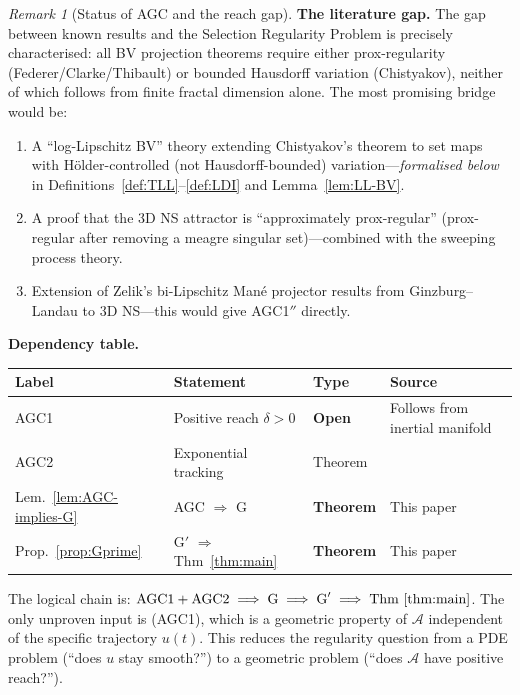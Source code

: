 \documentclass[12pt,a4paper]{article}
\theoremstyle{definition}
\theoremstyle{plain}
\theoremstyle{remark}
\newtheorem{remark}[definition]{Remark}
\begin{document}
\begin{remark}[Status of AGC and the reach gap]
\noindent
\textbf{The literature gap.}\;
The gap between known results and the Selection Regularity Problem is
precisely characterised: all BV projection theorems require either
prox-regularity (Federer/Clarke/Thibault) or bounded Hausdorff
variation (Chistyakov), neither of which follows from finite fractal
dimension alone.
The most promising bridge would be:
\begin{enumerate}
  \item A ``log-Lipschitz BV'' theory extending Chistyakov's theorem
    to set maps with H\"older-controlled (not Hausdorff-bounded)
    variation---\emph{formalised below} in
    Definitions~\ref{def:TLL}--\ref{def:LDI} and
    Lemma~\ref{lem:LL-BV}.
  \item A proof that the 3D NS attractor is ``approximately
    prox-regular'' (prox-regular after removing a meagre singular
    set)---combined with the sweeping process theory.
  \item Extension of Zelik's bi-Lipschitz Man\'e projector results
    from Ginzburg--Landau to 3D NS---this would give AGC1$''$
    directly.
\end{enumerate}

\medskip\noindent
\textbf{Dependency table.}
\medskip

\begin{center}
\begin{tabular}{llll}
\hline
\textbf{Label} & \textbf{Statement} & \textbf{Type} & \textbf{Source} \\
\hline
AGC1 & Positive reach $\delta > 0$ & \textbf{Open} &
  Follows from inertial manifold \\
AGC2 & Exponential tracking & Theorem &
  \cite{Temam2001} \\
Lem.~\ref{lem:AGC-implies-G} & AGC $\Rightarrow$ G &
  \textbf{Theorem} & This paper \\
Prop.~\ref{prop:Gprime} & G$'$ $\Rightarrow$
  Thm~\ref{thm:main} & \textbf{Theorem} & This paper \\
\hline
\end{tabular}
\end{center}

\medskip\noindent
The logical chain is:
$\textup{AGC1} + \textup{AGC2}
\;\Longrightarrow\;
\textup{G}
\;\Longrightarrow\;
\textup{G}'
\;\Longrightarrow\;
\textup{Thm~\ref{thm:main}}$.
The only unproven input is \textup{(AGC1)}, which is a geometric
property of $\mathcal{A}$ independent of the specific trajectory
$u(t)$. This reduces the regularity question from a PDE problem
(``does $u$ stay smooth?'') to a geometric problem (``does
$\mathcal{A}$ have positive reach?'').
\end{remark}
\end{document}
